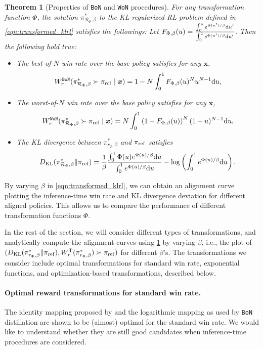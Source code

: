 \documentclass{article}
\makeatletter
\newcommand{\bx}{{\bm{x}}}
\newcommand{\dd}{{\rm d}}
\newcommand{\cR}{\mathcal{R}}
\newcommand{\tr}{\cR}
\newcommand{\reg}{\beta}
\newcommand{\KL}{D_{\text{KL}}}
\newcommand{\Paren}[1]{\left(#1\right)}
\newcommand{\bp}{{\pi_{\rm ref}}} %
\newcommand{\op}{\pi} %
\newtheorem{theorem}{Theorem}
\newcommand{\bofn}{\texttt{BoN}\xspace}
\newcommand{\wofn}{\texttt{WoN}\xspace}
\newcommand{\ie}{i.e.\@\xspace}
\makeatother
\begin{document}
\begin{theorem}[Properties of \bofn and \wofn procedures] \label{thm:wr_kl_bon_won}
For any transformation function $\Phi$, the solution $\pi^*_{\tr_{\Phi}, \reg}$ to the KL-regularized RL problem defined in \cref{eqn:transformed_klrl} satisfies the followings: Let $F_{\Phi, \reg}(u)= \frac{\int_{0}^u e^{\Phi(u')/\reg} \dd u'}{\int_{0}^1 e^{\Phi(u')/\reg} \dd u'}$. Then the following hold true:
\begin{itemize}
    \item The best-of-$N$ win rate over the base policy satisfies for any $\bx$,
    \[
    W^{\bofn}_r(\pi^*_{\tr_{\Phi}, \reg} \succ \bp \mid \bx) = 1 - N \int_{0}^1 F_{\Phi, \reg}(u)^N u^{N-1} \dd u,
    \]
    \item The worst-of-$N$ win rate over the base policy satisfies for any $\bx$,
    \[
    W^{\wofn}_r(\pi^*_{\tr_{\Phi}, \reg} \succ \bp \mid \bx) =  N \int_{0}^1 \Paren{1 - F_{\Phi, \reg}(u) }^N (1-u)^{N-1} \dd u,
    \]
     \item The KL divergence between $\pi^*_{r_{\Phi}, \reg}$  and $\bp$ satisfies
%
%
%
    \begin{equation}\label{eqn:kl_div_2}
    \KL(\op^*_{\cR_{\Phi}, \reg} \| \bp) =
\frac{1}{\reg}  \frac{ \int_{0}^1 \Phi(u) e^{\Phi(u)/\reg} \dd u }{\int_{0}^1 e^{\Phi(u)/\reg} \dd u} - \log \Paren{\int_{0}^1 e^{\Phi(u)/\reg} \dd u}.
    \end{equation}
\end{itemize}
\end{theorem}

By varying $\reg$ in \cref{eqn:transformed_klrl}, we can obtain an alignment curve plotting the inference-time win rate and KL divergence deviation for different aligned policies. This allows us to compare the performance of different transformation functions $\Phi$.

In the rest of the section, we will consider different types of transformations, and analytically compute the alignment curves using \cref{thm:wr_kl_bon_won} by varying $\reg$, \ie, the plot of $(\KL(\pi^*_{r_{\Phi}, \reg} \| \bp), W^{\rm T}_r(\pi^*_{r_{\Phi}, \reg}) \succ \bp)$ for different $\reg$'s. The transformations we consider include  optimal transformations for standard win rate, exponential functions, and optimization-based transformations, described below.

\paragraph{Optimal reward transformations for standard win rate.} The identity mapping proposed by \citet{azar2023general} and the logarithmic mapping as used by \bofn distillation \citep{beirami2024theoretical,yang2024asymptotics,amini2024variationalbestofnalignment,sessa2024bondaligningllmsbestofn} are shown to be (almost) optimal for the standard win rate. We would like to understand whether they are still good candidates when inference-time procedures are considered.
%
\end{document}
